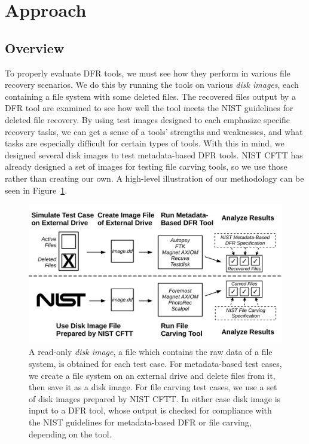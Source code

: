 \section{Approach}
\subsection{Overview}

To properly evaluate DFR tools, we must see how they perform in various file recovery scenarios.
We do this by running the tools on various \emph{disk images}, each containing a file system with some deleted files.
The recovered files output by a DFR tool are examined to see how well the tool meets the NIST guidelines for deleted file recovery.
By using test images designed to each emphasize specific recovery tasks, we can get a sense of a tools' strengths and weaknesses, and what tasks are especially difficult for certain types of tools.
With this in mind, we designed several disk images to test metadata-based DFR tools.
NIST CFTT has already designed a set of images for testing file carving tools, so we use those rather than creating our own.
A high-level illustration of our methodology can be seen in Figure~\ref{fig:overview}.


\begin{figure}[h]
    \centering
    \includegraphics[width=\linewidth]{fig/overview.pdf}
    \caption{
        A read-only \emph{disk image}, a file which contains the raw data of a file system, is obtained for each test case.
        For metadata-based test cases, we create a file system on an external drive and delete files from it, then save it as a disk image.
        For file carving test cases, we use a set of disk images prepared by NIST CFTT.
        In either case disk image is input to a DFR tool, whose output is checked for compliance with the NIST guidelines for metadata-based DFR or file carving, depending on the tool.
    }
    \label{fig:overview}
\end{figure}

